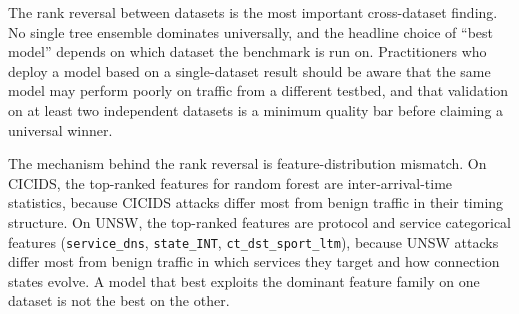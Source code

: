 The rank reversal between datasets is the most important cross-dataset
finding. No single tree ensemble dominates universally, and the headline
choice of ``best model'' depends on which dataset the benchmark is run
on. Practitioners who deploy a model based on a single-dataset result
should be aware that the same model may perform poorly on traffic from a
different testbed, and that validation on at least two independent
datasets is a minimum quality bar before claiming a universal winner.

The mechanism behind the rank reversal is feature-distribution
mismatch. On CICIDS, the top-ranked features for random forest are
inter-arrival-time statistics, because CICIDS attacks differ most from
benign traffic in their timing structure. On UNSW, the top-ranked
features are protocol and service categorical features
(\texttt{service\_dns}, \texttt{state\_INT}, \texttt{ct\_dst\_sport\_ltm}),
because UNSW attacks differ most from benign traffic in which services
they target and how connection states evolve. A model that best exploits
the dominant feature family on one dataset is not the best on the other.
